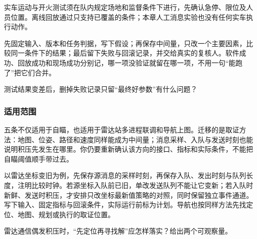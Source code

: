 \begin{note}
实车运动与开火测试须在队内规定场地和监督条件下进行，先确认急停、限位及人员位置。离线回放通过只支持已覆盖的条件；本章人工消息实验也没有任何实车执行动作。
\end{note}

\begin{conclusion}
先固定输入、版本和任务判据，写下假设；再保存中间量，只改一个主要因素，比较同一条件下的结果；最后留下失败与回滚记录，并交给真实的复核人。软件成功、回放成功和现场成功分别记，哪一项没验证就留在哪一项，不用一句“能跑了”把它们合并。
\end{conclusion}

\begin{exercise}
\label{v3-ex-engineering-3}
测试结果变差后，删掉失败记录只留“最终好参数”有什么问题？
\end{exercise}

\subsubsection{适用范围}

五条不仅适用于自瞄，也适用于雷达站多进程联调和导航上图。迁移的是取证方法：地图、位姿、路径和速度同样能成为中间量；消息采样、入队与发送时刻也能说明积压先发生在哪里。你仍要重新确认该方向的接口、指标和实际条件，不能把自瞄阈值顺手带过去。

\begin{example}[先留两个能区分原因的观察位置]
以雷达坐标变旧为例，先保存源消息的采样时刻，再保存入队、发出时刻与队列长度，注明比较时钟。若源坐标入队前已旧，单改发送队列不能让它变新；若入队时新鲜、发送时积压，才安排只改坐标最新值策略的对照，同时保留独立事件通道。写下输入、固定指标与回滚条件，实际运行前标为计划。导航也按同样方法先找定位、地图、规划或执行的取证位置。
\end{example}

\begin{exercise}
\label{v3-ex-engineering-4}
雷达通信偶发积压时，“先定位再寻找解”应怎样落实？给出两个可观察量。
\end{exercise}
